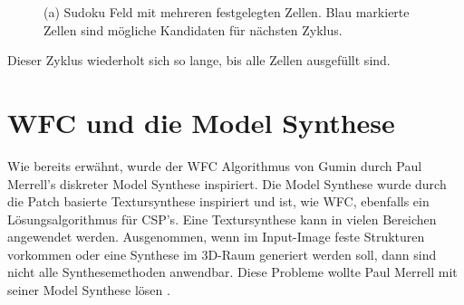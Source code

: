 \documentclass[12pt, a4paper,twoside,openany]{report} %
\begin{document}
\begin{figure}[H]
    \centering
    \caption{(a) Sudoku Feld mit mehreren festgelegten Zellen. Blau markierte Zellen sind mögliche Kandidaten für nächsten Zyklus.}%
\end{figure}

Dieser Zyklus wiederholt sich so lange, bis alle Zellen ausgefüllt sind.

\section{WFC und die Model Synthese}

Wie bereits erwähnt, wurde der WFC Algorithmus von Gumin durch Paul Merrell's diskreter Model Synthese inspiriert.
Die Model Synthese wurde durch die Patch basierte Textursynthese inspiriert und ist, wie WFC, ebenfalls ein Lösungsalgorithmus für CSP's.
\newline
Eine Textursynthese kann in vielen Bereichen angewendet werden.
Ausgenommen, wenn im Input-Image feste Strukturen vorkommen oder eine Synthese im 3D-Raum generiert werden soll,
dann sind nicht alle Synthesemethoden anwendbar.
Diese Probleme wollte Paul Merrell mit seiner Model Synthese lösen \cite{merrell2009model}.
\end{document}
